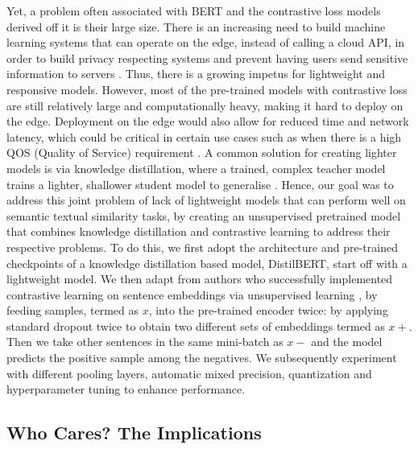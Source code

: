 \documentclass[10pt,twocolumn,letterpaper]{article}
\begin{document}
Yet, a problem often associated with BERT and the contrastive loss models derived off it is their large size. There is an increasing need to build machine learning systems that can operate on the edge, instead of calling a cloud API, in order to build privacy respecting systems and prevent having users send sensitive information to servers \cite{10.3390/s22020450}. Thus, there is a growing impetus for lightweight and responsive models. However, most of the pre-trained models \cite{2104.08821} \cite{2105.11741} with contrastive loss are still relatively large and computationally heavy, making it hard to deploy on the edge. Deployment on the edge would also allow for reduced time and network latency, which could be critical in certain use cases such as when there is a high QOS (Quality of Service) requirement \cite{10.3390/s22020450}. A common solution for creating lighter models is via knowledge distillation, where a trained, complex teacher model trains  a lighter, shallower student model to generalise \cite{1910.01108}.
Hence, our goal was to address this joint problem of lack of lightweight models that can perform well on semantic textual similarity tasks, by creating an unsupervised pretrained model that combines knowledge distillation and contrastive learning to address their respective problems.  To do this, we first adopt the architecture and pre-trained checkpoints of a knowledge distillation based model, DistilBERT, start off with a lightweight model. We then adapt from authors who successfully implemented contrastive learning on sentence embeddings via unsupervised learning \cite{2104.08821}, by feeding samples, termed as \(x\), into the pre-trained encoder twice: by applying standard dropout twice to obtain two different sets of embeddings termed as \(x+\). Then we take other sentences in the same mini-batch as \(x-\) and the model predicts the positive sample among the negatives. We subsequently experiment with different pooling layers, automatic mixed precision, quantization and hyperparameter tuning to enhance performance.

\subsection{Who Cares? The Implications}
\end{document}
